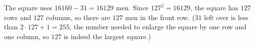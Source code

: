 The square uses $16160-31=16129$ men. Since $127^2=16129$, the square has $127$ rows and $127$ columns, so there are $\boxed{127}$ men in the front row. ($31$ left over is less than $2\cdot127+1=255$, the number needed to enlarge the square by one row and one column, so $127$ is indeed the largest square.)
